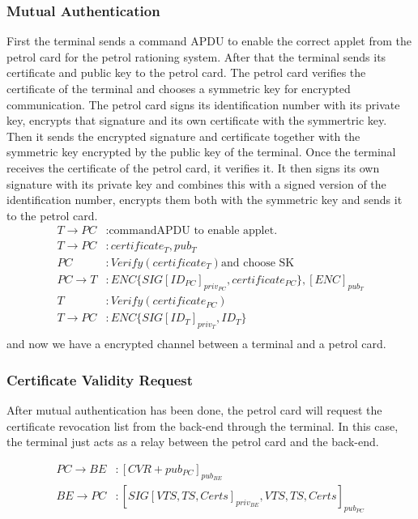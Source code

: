 \subsubsection{Mutual Authentication}
First the terminal sends a command APDU to enable the correct applet from the petrol card for the petrol rationing system. After that the terminal sends its certificate and public key to the petrol card. The petrol card verifies the certificate of the terminal and chooses a symmetric key for encrypted communication. The petrol card signs its identification number with its private key, encrypts that signature and its own certificate with the symmertric key. Then it sends the encrypted signature and certificate together with the symmetric key encrypted by the public key of the terminal. Once the terminal receives the certificate of the petrol card, it verifies it. It then signs its own signature with its private key and combines this with a signed version of the identification number, encrypts them both with the symmetric key and sends it to the petrol card.
\\

\begin{equation}\nonumber
\begin{split} 
T \to PC &: \text{commandAPDU to enable applet.}\\
T \to PC &: certificate_{T}, pub_{T}\\ 
PC &: Verify(certificate_{T}) \text{and choose SK}\\
PC \to T &: ENC\{SIG[ID_{PC}]_{priv_{PC}}, certificate_{PC}\},  [ENC]_{pub_T}\\
T&: Verify(certificate_{PC})\\
T \to PC &: ENC\{SIG[ID_{T}]_{priv_T}, ID_{T}\} \\ 
\end{split} 
\end{equation}
and now we have a encrypted channel between a terminal and a petrol card.

\subsubsection{Certificate Validity Request}
After mutual authentication has been done, the petrol card will request the certificate revocation list from the back-end through the terminal. In this case, the terminal just acts as a relay between the petrol card and the back-end.

\begin{equation}\nonumber
\begin{split}
PC \to BE &: [CVR + pub_{PC}]_{pub_{BE}}\\
BE \to PC &: [SIG[VTS, TS, Certs]_{priv_{BE}}, VTS, TS, Certs]_{pub_{PC}}
\end{split} 
\end{equation}
